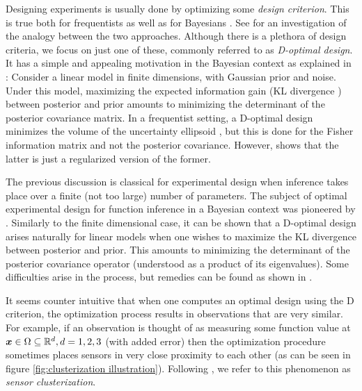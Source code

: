 \documentclass{amsart}
\numberwithin{equation}{section}
\begin{document}
Designing experiments is usually done by optimizing some \emph{design
  criterion}. This is true both for frequentists
\cite{Silvey13,Ucinski05} as well as for Bayesians
\cite{ChalonerVerdinelli95}. See \cite{ChalonerVerdinelli95} for an
investigation of the analogy between the two approaches. Although
there is a plethora of design criteria, we focus on just one of these,
commonly referred to as \emph{D-optimal design}. It has a simple and
appealing motivation in the Bayesian context as explained in
\cite{ChalonerVerdinelli95}: Consider a linear model in finite
dimensions, with Gaussian prior and noise. Under this model,
maximizing the expected information gain (KL divergence
\cite{KullbackLeibler51,CoverThomas12}) between posterior and prior
amounts to minimizing the determinant of the posterior covariance
matrix. In a frequentist setting, a D-optimal design minimizes the
volume of the uncertainty ellipsoid \cite[page 16]{Ucinski05}, but
this is done for the Fisher information matrix and not the posterior
covariance. However, \cite{ChalonerVerdinelli95} shows that the latter
is just a regularized version of the former.

The previous discussion is classical for experimental design when
inference takes place over a finite (not too large) number of
parameters. The subject of optimal experimental design for function
inference in a Bayesian context was pioneered by
\cite{AlexanderianGloorGhattas14, AlexanderianPetraStadlerEtAl16,
  AlexanderianPetraStadlerEtAl14}. Similarly to the finite dimensional
case, it can be shown that a D-optimal design arises naturally for
linear models when one wishes to maximize the KL divergence between
posterior and prior. This amounts to minimizing the determinant of the
posterior covariance operator (understood as a product of its
eigenvalues). Some difficulties arise in the process, but remedies can
be found as shown in \cite{AlexanderianGloorGhattas14}.

It seems counter intuitive that when one computes an optimal design
using the D criterion, the optimization process results in
observations that are very similar. For example, if an observation is
thought of as measuring some function value at ${\boldsymbol{x}} \in \Omega
\subseteq \mathbb{R}^d, d=1,2,3$ (with added error) then the optimization
procedure sometimes places sensors in very close proximity to each
other (as can be seen in figure \ref{fig:clusterization
  illustration}). Following \cite{Ucinski05}, we refer to this
phenomenon as \emph{sensor clusterization}.
\end{document}

